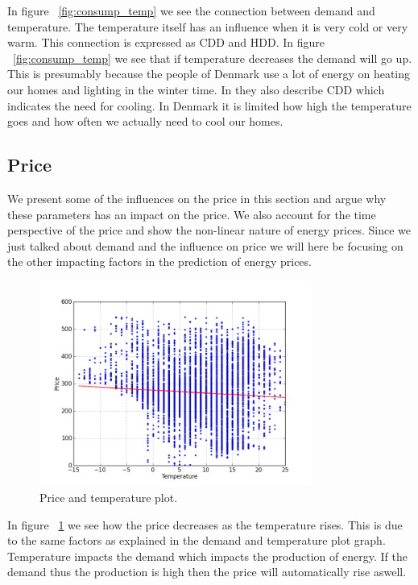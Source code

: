 In figure ~\ref{fig:consump_temp} we see the connection between demand and temperature. The temperature itself has an influence when it is very cold or very warm. This connection is expressed as CDD and HDD. In figure ~\ref{fig:consump_temp} we see that if temperature decreases the demand will go up. This is presumably because the people of Denmark use a lot of energy on heating our homes and lighting in the winter time. In \cite{19} they also describe CDD which indicates the need for cooling. In Denmark it is limited how high the temperature goes and how often we actually need to cool our homes.

\subsection{Price}
We present some of the influences on the price in this section and argue why these parameters has an impact on the price. We also account for the time perspective of the price and show the non-linear nature of energy prices. Since we just talked about demand and the influence on price we will here be focusing on the other impacting factors in the prediction of energy prices.

\begin{figure}[H]
\centering
\includegraphics[width=0.8\textwidth ,natwidth=410,natheight=237]{billeder/energy_price_plots/price_temp.png}
\caption{Price and temperature plot.}
\label{fig:price_temp}
\end{figure}

In figure ~\ref{fig:price_temp} we see how the price decreases as the temperature rises. This is due to the same factors as explained in the demand and temperature plot graph. Temperature impacts the demand which impacts the production of energy. If the demand thus the production is high then the price will automatically rise aswell.

